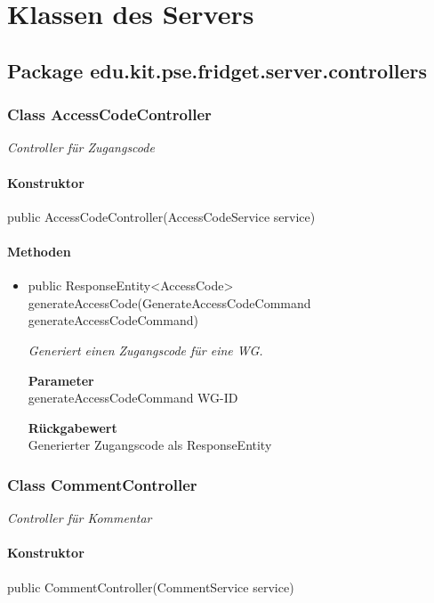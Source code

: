 \documentclass[a4paper]{scrreprt}
\begin{document}
	\chapter{Klassen des Servers}
    \section{Package edu.kit.pse.fridget.server.controllers}
    \subsection{Class AccessCodeController}
    \textit{Controller für Zugangscode}
    \subsubsection{Konstruktor}
    public AccessCodeController(AccessCodeService service)
    \subsubsection{Methoden}
    \begin{itemize}
    	\item{public ResponseEntity<AccessCode> generateAccessCode(GenerateAccessCodeCommand generateAccessCodeCommand)}
    	
    	\textit{Generiert einen Zugangscode für eine WG.}
    	
    	\textbf{Parameter} \\
    	generateAccessCodeCommand WG-ID
    	
    	\textbf{Rückgabewert} \\
    	Generierter Zugangscode als ResponseEntity
    \end{itemize}
    \subsection{Class CommentController}
    \textit{Controller für Kommentar}
    \subsubsection{Konstruktor}
    public CommentController(CommentService service)
\end{document}
